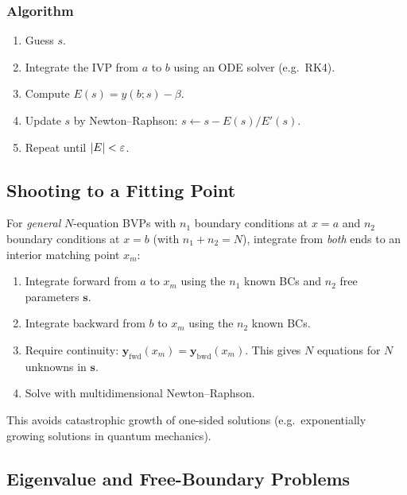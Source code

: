 \subsubsection*{Algorithm}
\begin{enumerate}
  \item Guess $s$.
  \item Integrate the IVP from $a$ to $b$ using an ODE solver (e.g.\ RK4).
  \item Compute $E(s) = y(b;s) - \beta$.
  \item Update $s$ by Newton–Raphson: $s \leftarrow s - E(s)/E'(s)$.
  \item Repeat until $|E| < \varepsilon$.
\end{enumerate}


\subsection{Shooting to a Fitting Point}\label{subsec:lec13:fitting}

For \emph{general} $N$-equation BVPs with $n_1$ boundary conditions
at $x=a$ and $n_2$ boundary conditions at $x=b$ (with $n_1+n_2=N$),
integrate from \emph{both} ends to an interior matching point $x_m$:

\begin{enumerate}
  \item Integrate forward from $a$ to $x_m$ using the $n_1$ known BCs
        and $n_2$ free parameters $\mathbf{s}$.
  \item Integrate backward from $b$ to $x_m$ using the $n_2$ known BCs.
  \item Require continuity: $\mathbf{y}_\text{fwd}(x_m) = \mathbf{y}_\text{bwd}(x_m)$.
        This gives $N$ equations for $N$ unknowns in $\mathbf{s}$.
  \item Solve with multidimensional Newton–Raphson.
\end{enumerate}

This avoids catastrophic growth of one-sided solutions
(e.g.\ exponentially growing solutions in quantum mechanics).

\subsection{Eigenvalue and Free-Boundary Problems}\label{subsec:lec13:eigenvalue}

